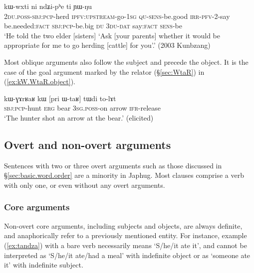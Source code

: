 \begin{exe}
\ex \label{ex:O.ndZiphe}
\gll [nɯ-kɯ-lɤɣ lu-ɕe-a ɯ-ɲɯ́-pe a-tɤ-tɯ-ti ra] kɯ-wxti ni ndʑi-pʰe ti ɲɯ-ŋu\\
\textsc{2du}.\textsc{poss}-\textsc{sbj}:\textsc{pcp}-herd \textsc{ipfv}:\textsc{upstream}-go-\textsc{1sg} \textsc{qu}-\textsc{sens}-be.good \textsc{irr}-\textsc{pfv}-2-say be.needed:\textsc{fact}  \textsc{sbj}:\textsc{pcp}-be.big \textsc{du} \textsc{3du}-\textsc{dat} say:\textsc{fact} \textsc{sens}-be\\
\glt `He told the two elder [sisters] `Ask [your parents] whether it would be appropriate for me to go herding [cattle] for you'.' (2003 Kunbzang)
\end{exe}

Most oblique arguments also follow the subject and precede the object. It is the case of the goal argument marked by the relator  (§\ref{sec:WtaR}) in (\ref{ex:kW.WtaR.object}).

\begin{exe}
\ex \label{ex:kW.WtaR.object}
\gll  kɯ-ɣɤrʁaʁ kɯ [pri ɯ-taʁ] tɯdi to-lɤt \\
\textsc{sbj}:\textsc{pcp}-hunt \textsc{erg} bear \textsc{3sg}.\textsc{poss}-on arrow \textsc{ifr}-release \\
\glt `The hunter shot an arrow at the bear.' (elicited)
\end{exe}

\subsection{Overt and non-overt arguments} \label{sec:overt.non.overt}
Sentences with two or three overt arguments such as those discussed in §\ref{sec:basic.word.order} are a minority in Japhug. Most clauses comprise a verb with only one, or even without any overt arguments.

\subsubsection{Core arguments} \label{sec:nonovert.core.arguments}
Non-overt core arguments, including subjects and objects, are always definite, and anaphorically refer to a previously mentioned entity. For instance, example (\ref{ex:tandza}) with a bare verb necessarily means `S/he/it ate it', and cannot be interpreted as `S/he/it ate/had a meal' with indefinite object or as `someone ate it' with indefinite subject.

